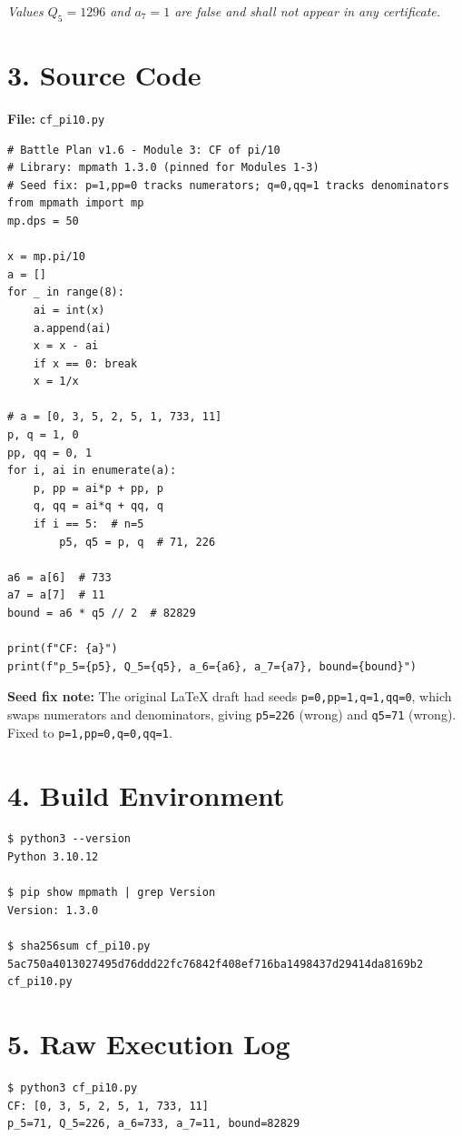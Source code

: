 \documentclass[11pt,letterpaper]{article}
\begin{document}
\noindent\textit{Values $Q_5 = 1296$ and $a_7 = 1$ are false and shall not appear in any certificate.}

\section*{3. Source Code}

\textbf{File:} \texttt{cf\_pi10.py}
\begin{lstlisting}
# Battle Plan v1.6 - Module 3: CF of pi/10
# Library: mpmath 1.3.0 (pinned for Modules 1-3)
# Seed fix: p=1,pp=0 tracks numerators; q=0,qq=1 tracks denominators
from mpmath import mp
mp.dps = 50

x = mp.pi/10
a = []
for _ in range(8):
    ai = int(x)
    a.append(ai)
    x = x - ai
    if x == 0: break
    x = 1/x

# a = [0, 3, 5, 2, 5, 1, 733, 11]
p, q = 1, 0
pp, qq = 0, 1
for i, ai in enumerate(a):
    p, pp = ai*p + pp, p
    q, qq = ai*q + qq, q
    if i == 5:  # n=5
        p5, q5 = p, q  # 71, 226

a6 = a[6]  # 733
a7 = a[7]  # 11
bound = a6 * q5 // 2  # 82829

print(f"CF: {a}")
print(f"p_5={p5}, Q_5={q5}, a_6={a6}, a_7={a7}, bound={bound}")
\end{lstlisting}

\noindent\textbf{Seed fix note:} The original LaTeX draft had seeds \texttt{p=0,pp=1,q=1,qq=0},
which swaps numerators and denominators, giving \texttt{p5=226} (wrong) and \texttt{q5=71} (wrong).
Fixed to \texttt{p=1,pp=0,q=0,qq=1}.

\section*{4. Build Environment}

\begin{lstlisting}
$ python3 --version
Python 3.10.12

$ pip show mpmath | grep Version
Version: 1.3.0

$ sha256sum cf_pi10.py
5ac750a4013027495d76ddd22fc76842f408ef716ba1498437d29414da8169b2  cf_pi10.py
\end{lstlisting}

\section*{5. Raw Execution Log}

\begin{lstlisting}
$ python3 cf_pi10.py
CF: [0, 3, 5, 2, 5, 1, 733, 11]
p_5=71, Q_5=226, a_6=733, a_7=11, bound=82829
\end{lstlisting}
\end{document}
